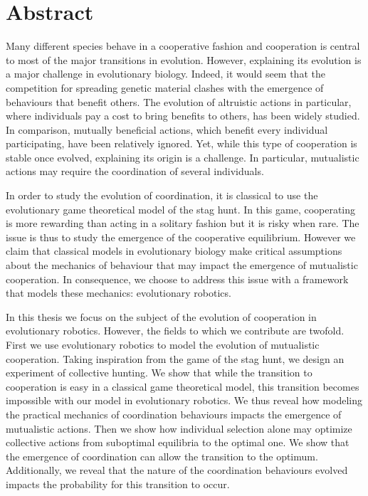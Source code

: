 \newpage
\section*{Abstract}

	Many different species behave in a cooperative fashion and cooperation is central to most of the major transitions in evolution. However, explaining its evolution is a major challenge in evolutionary biology. Indeed, it would seem that the competition for spreading genetic material clashes with the emergence of behaviours that benefit others. The evolution of altruistic actions in particular, where individuals pay a cost to bring benefits to others, has been widely studied. In comparison, mutually beneficial actions, which benefit every individual participating, have been relatively ignored. Yet, while this type of cooperation is stable once evolved, explaining its origin is a challenge. In particular, mutualistic actions may require the coordination of several individuals.

	In order to study the evolution of coordination, it is classical to use the evolutionary game theoretical model of the stag hunt. In this game, cooperating is more rewarding than acting in a solitary fashion but it is risky when rare. The issue is thus to study the emergence of the cooperative equilibrium. However we claim that classical models in evolutionary biology make critical assumptions about the mechanics of behaviour that may impact the emergence of mutualistic cooperation. In consequence, we choose to address this issue with a framework that models these mechanics: evolutionary robotics.

	In this thesis we focus on the subject of the evolution of cooperation in evolutionary robotics. However, the fields to which we contribute are twofold. First we use evolutionary robotics to model the evolution of mutualistic cooperation. Taking inspiration from the game of the stag hunt, we design an experiment of collective hunting. We show that while the transition to cooperation is easy in a classical game theoretical model, this transition becomes impossible with our model in evolutionary robotics. We thus reveal how modeling the practical mechanics of coordination behaviours impacts the emergence of mutualistic actions. Then we show how individual selection alone may optimize collective actions from suboptimal equilibria to the optimal one. We show that the emergence of coordination can allow the transition to the optimum. Additionally, we reveal that the nature of the coordination behaviours evolved impacts the probability for this transition to occur.

